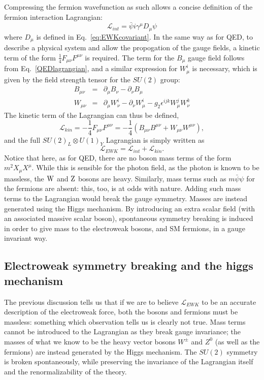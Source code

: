 Compressing the fermion wavefunction as such allows a concise definition of the fermion interaction Lagrangian:
\begin{equation}
\mathcal{L}_{int} = \bar{\psi} i \gamma^{\mu} D_{\mu} \psi
\end{equation} 
where $D_{\mu}$ is defined in Eq.~\ref{eq:EWKcovariant}.
In the same way as for \ac{QED}, to describe a physical system and allow the propogation of the gauge fields, 
a kinetic term of the form $\frac{1}{4}F_{\mu \nu}F^{\mu \nu}$ is required. 
The term for the $B_{\mu}$ gauge field follows from Eq.~\ref{QEDlagrangian}, 
and a similar expression for $W^{i}_{\mu}$ is necessary, which is given by the field strength tensor for the $SU(2)$ group:
\begin{eqnarray}
B_{\mu\nu} &=& \partial_{\mu}B_{\nu} - \partial_{\nu}B_{\mu} \\
W_{\mu\nu} &=& \partial_{\mu}W^{i}_{\nu} - \partial_{\nu}W^{i}_{\mu} -g_{2} \epsilon^{ijk} W^{j}_{\mu} W^{k}_{\nu} 
\end{eqnarray}
%
The kinetic term of the Lagrangian can thus be defined,
\begin{equation}
\mathcal{L}_{kin} = - \frac{1}{4}F_{\mu \nu}F^{\mu \nu} = - \frac{1}{4}\left( B_{\mu\nu}B^{\mu\nu} +  W_{\mu\nu} W^{\mu\nu} \right),
\end{equation}
and the full $SU(2)_{L} \otimes U(1)_{Y}$ Lagrangian is simply written as
\begin{equation}
\mathcal{L}_{EWK} = \mathcal{L}_{int} + \mathcal{L}_{kin}.
\end{equation}
Notice that here, as for \ac{QED}, there are no boson mass terms of the form $m^{2}X_{\mu}X^{\mu}$. 
While this is sensible for the photon field, as the photon is known to be massless, the $\mathrm{W}$ and $\mathrm{Z}$ bosons are heavy. 
Similarly, mass terms such as $m\bar{\psi} \psi$ for the fermions are absent: this, too, is at odds with nature.
Adding such mass terms to the Lagrangian would break the gauge symmetry.
%
Masses are instead generated using the Higgs mechanism. 
By introducing an extra scalar field (with an associated massive scalar boson), spontaneous symmetry breaking is induced in order to give mass to the electroweak bosons, and \ac{SM} fermions, in a gauge invariant way.


\subsection{Electroweak symmetry breaking and the higgs mechanism \label{th:Higgs}}
%
The previous discussion tells us that if we are to believe $\mathcal{L}_{EWK}$ to be an accurate description of the electroweak force, 
both the bosons and fermions must be massless: something which observation tells us is clearly not true.
Mass terms cannot be introduced to the Lagrangian as they break gauge invariance;
the masses of what we know to be the heavy vector bosons $W^{\pm}$ and $Z^{0}$ 
(as well as the fermions) are instead generated by the Higgs mechanism.
The $SU(2)$ symmetry is broken spontaneously, while preserving the invariance of the Lagrangian itself and the renormalizability of the theory.

